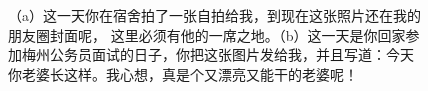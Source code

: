 \documentclass[cn,11pt,chinese]{elegantbook}
\begin{document}
\begin{figure}
    \caption{（a）这一天你在宿舍拍了一张自拍给我，到现在这张照片还在我的朋友圈封面呢，
    这里必须有他的一席之地。（b）这一天是你回家参加梅州公务员面试的日子，你把这张图片发给我，并且写道：今天
    你老婆长这样。我心想，真是个又漂亮又能干的老婆呢！}
\end{figure}
\end{document}
